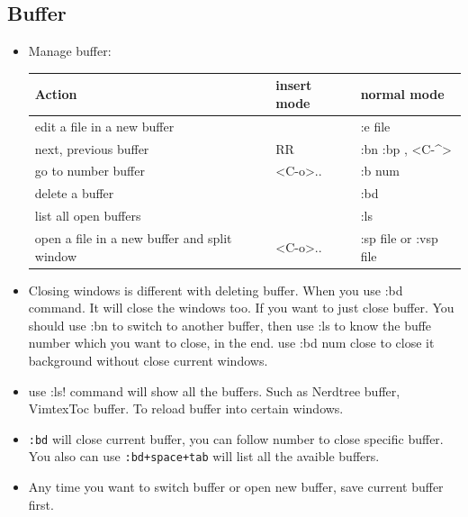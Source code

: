 \documentclass[a4paper,11pt,twoside]{book}
\begin{document}
\subsection{Buffer}
\begin{itemize}
		\item Manage buffer:
\begin{center}
\begin{tabular}{p{}|p{}|p{}}
		   \hline
		Action & insert mode & normal mode \\
		
		\hline 
		edit a file in a new buffer & &  :e file\\
				
		\hline 
		next, previous buffer & RR &  :bn :bp , <C-\^{}> \\
		
        \hline 
		go to number buffer &<C-o>.. &  :b num \\		
		
		\hline 
		delete a buffer & & :bd \\
		
		\hline 
		list all open buffers & & :ls\\
		
		\hline
		open a file in a new buffer and split window
	 & <C-o>..& :sp file or :vsp file \\
	\hline 	
			\end{tabular}
	\end{center}

			\item Closing windows is different with deleting buffer. When you use :bd command. It will close the windows too. If you want to just close buffer. You should use :bn to switch to another buffer, then use :ls to know the buffe number which you want to close, in the end. use :bd num close to close it background without close current windows.

		\item use :ls! command will show all the buffers. Such as Nerdtree buffer, VimtexToc buffer. To reload buffer into certain windows. 

			\item \texttt{:bd} will close current buffer, you can follow number to close specific buffer. You also can use \texttt{:bd+space+tab} will list all the avaible buffers.

			\item Any time you want to switch buffer or open new buffer, save current buffer first.
			

\end{itemize}
\end{document}
